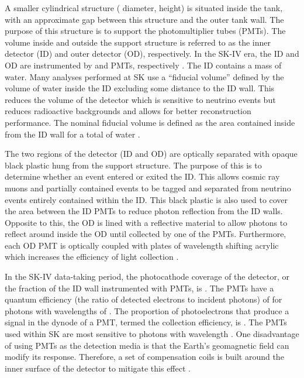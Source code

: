 A smaller cylindrical structure ( diameter,  height) is situated inside the tank, with an approximate  gap between this structure and the outer tank wall. The purpose of this structure is to support the photomultiplier tubes (PMTs). The volume inside and outside the support structure is referred to as the inner detector (ID) and outer detector (OD), respectively. In the SK-IV era, the ID and OD are instrumented by   and   PMTs, respectively \cite{Abe_2014_SKCalib}. The ID contains a  mass of water. Many analyses performed at SK use a ``fiducial volume'' defined by the volume of water inside the ID excluding some distance to the ID wall. This reduces the volume of the detector which is sensitive to neutrino events but reduces radioactive backgrounds and allows for better reconstruction performance. The nominal fiducial volume is defined as the area contained inside  from the ID wall for a total of  water \cite{Jiang2019-iw}.

The two regions of the detector (ID and OD) are optically separated with opaque black plastic hung from the support structure. The purpose of this is to determine whether an event entered or exited the ID. This allows cosmic ray muons and partially contained events to be tagged and separated from neutrino events entirely contained within the ID. This black plastic is also used to cover the area between the ID PMTs to reduce photon reflection from the ID walls. Opposite to this, the OD is lined with a reflective material to allow photons to reflect around inside the OD until collected by one of the PMTs. Furthermore, each OD PMT is optically coupled with  plates of wavelength shifting acrylic which increases the efficiency of light collection \cite{Fukuda2003-ly}.

In the SK-IV data-taking period, the photocathode coverage of the detector, or the fraction of the ID wall instrumented with PMTs, is  \cite{Fukuda2003-ly}. The PMTs have a quantum efficiency (the ratio of detected electrons to incident photons) of  for photons with wavelengths of  \cite{KUME1983443, Suzuki1993}. The proportion of photoelectrons that produce a signal in the dynode of a PMT, termed the collection efficiency, is  \cite{Fukuda2003-ly}. The PMTs used within SK are most sensitive to photons with wavelength  \cite{Fukuda2003-ly}. One disadvantage of using PMTs as the detection media is that the Earth's geomagnetic field can modify its response. Therefore, a set of compensation coils is built around the inner surface of the detector to mitigate this effect \cite{Fukuda2003-ly}.

